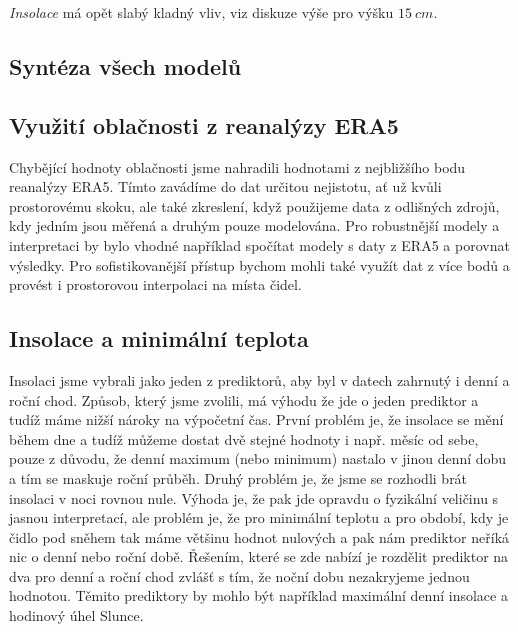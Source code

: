 \textit{Insolace} má opět slabý kladný vliv, viz diskuze výše pro výšku $\SI{15}{cm}$.

\subsection{Syntéza všech modelů}

\subsection{Využití oblačnosti z reanalýzy ERA5}
Chybějící hodnoty oblačnosti jsme nahradili hodnotami z nejbližšího bodu reanalýzy ERA5. Tímto zavádíme do dat určitou nejistotu, ať už kvůli prostorovému skoku, ale také zkreslení, když použijeme data z odlišných zdrojů, kdy jedním jsou měřená a druhým pouze modelována. Pro robustnější modely a interpretaci by bylo vhodné například spočítat modely s daty z ERA5 a porovnat výsledky. Pro sofistikovanější přístup bychom mohli také využít dat z více bodů a provést i prostorovou interpolaci na místa čidel.

\subsection{Insolace a minimální teplota}\label{chap:mintemp_insolation}
Insolaci jsme vybrali jako jeden z prediktorů, aby byl v datech zahrnutý i denní a roční chod. Způsob, který jsme zvolili, má výhodu že jde o jeden prediktor a tudíž máme nižší nároky na výpočetní čas. První problém je, že insolace se mění během dne a tudíž můžeme dostat dvě stejné hodnoty i např. měsíc od sebe, pouze z důvodu, že denní maximum (nebo minimum) nastalo v jinou denní dobu a tím se maskuje roční průběh. Druhý problém je, že jsme se rozhodli brát insolaci v noci rovnou nule. Výhoda je, že pak jde opravdu o fyzikální veličinu s jasnou interpretací, ale problém je, že pro minimální teplotu a pro období, kdy je čidlo pod sněhem tak máme většinu hodnot nulových a pak nám prediktor neříká nic o denní nebo roční době. Řešením, které se zde nabízí je rozdělit prediktor na dva pro denní a roční chod zvlášť s tím, že noční dobu nezakryjeme jednou hodnotou. Těmito prediktory by mohlo být například maximální denní insolace a hodinový úhel Slunce.

